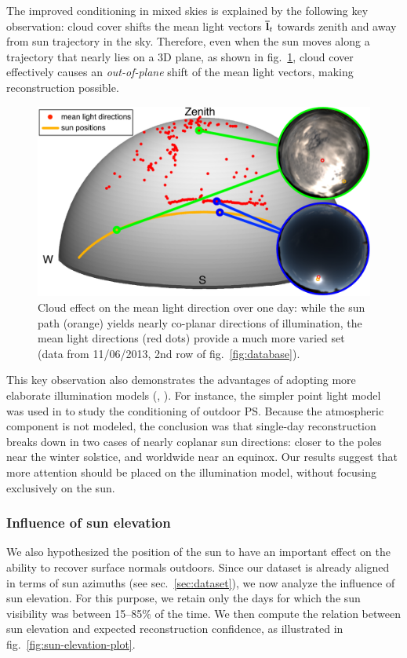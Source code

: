 The improved conditioning in mixed skies is explained by the following key observation: cloud cover shifts the mean light vectors ${\bf \bar l}_t$ towards zenith and away from sun trajectory in the sky. Therefore, even when the sun moves along a trajectory that nearly lies on a 3D plane, as shown in fig.~\ref{fig:mlv}, cloud cover effectively causes an {\em out-of-plane} shift of the mean light vectors, making reconstruction possible.

\begin{figure}
    \centering
    \includegraphics[width=0.5\linewidth]{./figures/mlvFig/mlvFig.pdf}
    \caption{Cloud effect on the mean light direction over one day: while the sun path (orange) yields nearly co-planar directions of illumination, the mean light directions (red dots) provide a much more varied set (data from 11/06/2013, 2nd row of fig.~\ref{fig:database}).}
    \label{fig:mlv}
\end{figure}

This key observation also demonstrates the advantages of adopting more elaborate illumination models (\eg, \cite{yu-iccp-13}). For instance, the simpler point light model was used in \cite{shen-pg-14} to study the conditioning of outdoor PS. Because the atmospheric component is not modeled, the conclusion was that single-day reconstruction breaks down in two cases of nearly coplanar sun directions: closer to the poles near the winter solstice, and worldwide near an equinox. Our results suggest that more attention should be placed on the illumination model, without focusing exclusively on the sun.

\subsubsection{Influence of sun elevation}
\label{sec:sun-elevation-results}

We also hypothesized the position of the sun to have an important effect on the ability to recover surface normals outdoors. Since our dataset is already aligned in terms of sun azimuths (see sec.~\ref{sec:dataset}), we now analyze the influence of sun elevation. For this purpose, we retain only the days for which the sun visibility was between 15--85\% of the time. We then compute the relation between sun elevation and expected reconstruction confidence, as illustrated in fig.~\ref{fig:sun-elevation-plot}.

